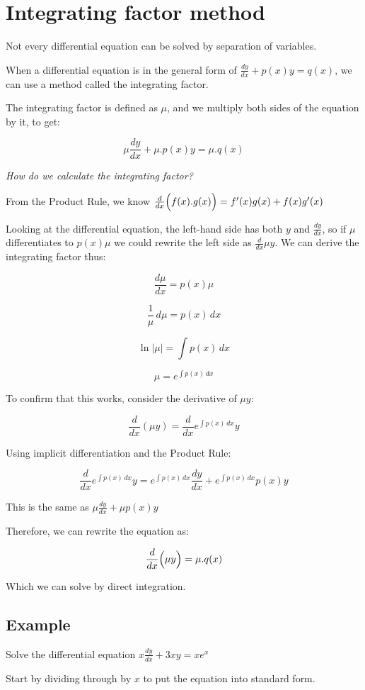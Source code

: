 \documentclass[../main.tex]{subfiles}
\begin{document}
\section{Integrating factor method}
Not every differential equation can be solved by separation of variables.

When a differential equation is in the general form of $\frac{dy}{dx}+p(x)y=q(x)$, we can use a method called the integrating factor.

The integrating factor is defined as $\mu$, and we multiply both sides of the equation by it, to get:

\[\mu \frac{dy}{dx}+\mu.p(x)y=\mu.q(x)\]

\textit{How do we calculate the integrating factor?}

From the Product Rule, we know $\frac{d}{dx}\Bigl(f(x).g(x)\Bigr)=f'(x)g(x)+f(x)g'(x)$

Looking at the differential equation, the left-hand side has both $y$ and $\frac{dy}{dx}$, so if $\mu$ differentiates to $p(x)\mu$ we could rewrite the left side as $\frac{d}{dx}\mu y$. We can derive the integrating factor thus:

\[\frac{d\mu}{dx}=p(x)\mu\]

\[\frac{1}{\mu}\,d\mu=p(x)\,dx\]

\[\ln{|\mu|}=\int p(x)\,dx\]

\[\mu=e^{\int p(x)\,dx}\]

To confirm that this works, consider the derivative of $\mu y$:

\[\frac{d}{dx}(\mu y)=\frac{d}{dx}e^{\int p(x)\,dx}y\]

Using implicit differentiation and the Product Rule:

\[\frac{d}{dx}e^{\int p(x)\,dx}y=e^{\int p(x)\,dx}\frac{dy}{dx}+e^{\int p(x)\,dx}p(x)y\]
    
This is the same as $\mu \frac{dy}{dx}+\mu p(x)y$

Therefore, we can rewrite the equation as:

\[\frac{d}{dx}\Bigl(\mu y\Bigr)=\mu.q(x)\]

Which we can solve by direct integration.

\subsection*{Example}
Solve the differential equation $x\frac{dy}{dx}+3xy=xe^x$

Start by dividing through by $x$ to put the equation into standard form.
\end{document}
